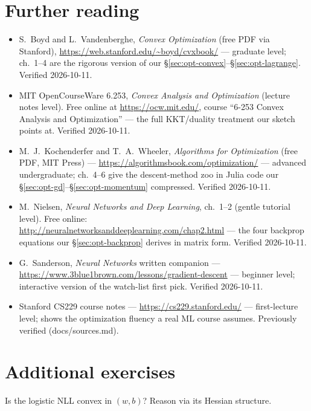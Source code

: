\section*{Further reading}

\begin{itemize}
\item S.~Boyd and L.~Vandenberghe, \emph{Convex Optimization} (free PDF
via Stanford), \url{https://web.stanford.edu/~boyd/cvxbook/} ---
graduate level; ch.~1--4 are the rigorous version of our
\S\ref{sec:opt-convex}--\S\ref{sec:opt-lagrange}. Verified 2026-10-11.
\item MIT OpenCourseWare 6.253, \emph{Convex Analysis and Optimization}
(lecture notes level). Free online at \url{https://ocw.mit.edu/},
course ``6-253 Convex Analysis and Optimization'' --- the full
KKT/duality treatment our sketch points at. Verified 2026-10-11.
\item M.~J.~Kochenderfer and T.~A.~Wheeler, \emph{Algorithms for
Optimization} (free PDF, MIT Press) ---
\url{https://algorithmsbook.com/optimization/} --- advanced
undergraduate; ch.~4--6 give the descent-method zoo in Julia code our
\S\ref{sec:opt-gd}--\S\ref{sec:opt-momentum} compressed. Verified
2026-10-11.
\item M.~Nielsen, \emph{Neural Networks and Deep Learning}, ch.~1--2
(gentle tutorial level). Free online:\\
\url{http://neuralnetworksanddeeplearning.com/chap2.html} --- the four
backprop equations our \S\ref{sec:opt-backprop} derives in matrix
form. Verified 2026-10-11.
\item G.~Sanderson, \emph{Neural Networks} written companion ---
\url{https://www.3blue1brown.com/lessons/gradient-descent} --- beginner
level; interactive version of the watch-list first pick. Verified
2026-10-11.
\item Stanford CS229 course notes --- \url{https://cs229.stanford.edu/}
--- first-lecture level; shows the optimization fluency a real ML
course assumes. Previously verified (docs/sources.md).
\end{itemize}

\section*{Additional exercises}

\begin{exercise}[easy]
Is the logistic NLL convex in $(w,b)$? Reason via its Hessian structure.
\end{exercise}

